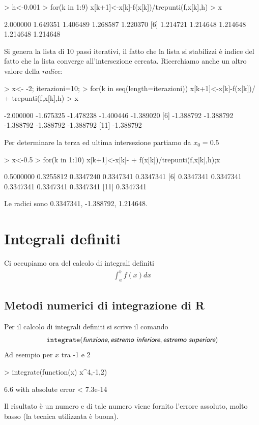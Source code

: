 \documentclass[onecolumn,11pt]{book}
\newcommand{\varia}[1]{\textsl{\textsf{#1}}}
\begin{document}
\begin{Schunk}
\begin{Sinput}
> h<-0.001
> for(k in 1:9) x[k+1]<-x[k]-f(x[k])/trepunti(f,x[k],h)
> x
\end{Sinput}
\begin{Soutput}
 [1] 2.000000 1.649351 1.406489 1.268587 1.220370
 [6] 1.214721 1.214648 1.214648 1.214648 1.214648
\end{Soutput}
\end{Schunk}
Si genera la lista di 10 passi iterativi, il fatto che la lista si stabilizzi \`e indice del fatto che la lista converge all'intersezione cercata.  Ricerchiamo anche un altro valore della {\it radice}:
\begin{Schunk}
\begin{Sinput}
> x<- -2; iterazioni=10;
> for(k in seq(length=iterazioni)) x[k+1]<-x[k]-f(x[k])/
+ trepunti(f,x[k],h)
> x
\end{Sinput}
\begin{Soutput}
 [1] -2.000000 -1.675325 -1.478238 -1.400446 -1.389020
 [6] -1.388792 -1.388792 -1.388792 -1.388792 -1.388792
[11] -1.388792
\end{Soutput}
\end{Schunk}
Per determinare la terza ed ultima intersezione partiamo da $x_0=0.5$
\begin{Schunk}
\begin{Sinput}
> x<-0.5
> for(k in 1:10) x[k+1]<-x[k]-
+ f(x[k])/trepunti(f,x[k],h);x
\end{Sinput}
\begin{Soutput}
 [1] 0.5000000 0.3255812 0.3347240 0.3347341 0.3347341
 [6] 0.3347341 0.3347341 0.3347341 0.3347341 0.3347341
[11] 0.3347341
\end{Soutput}
\end{Schunk}
Le radici sono 0.3347341, -1.388792, 1.214648.
\section{Integrali definiti}
Ci occupiamo ora del calcolo di integrali definiti
\begin{eqnarray*}
\int_a^b f(x)dx
\end{eqnarray*}

\subsection{Metodi numerici di integrazione di \textsf{R}}
Per il calcolo di integrali definiti si scrive il comando
\begin{eqnarray*}
\texttt{integrate}(\varia{funzione},
\varia{estremo inferiore}, \varia{estremo superiore})
\end{eqnarray*}
Ad esempio per $x$ tra -1 e 2
\begin{Schunk}
\begin{Sinput}
> integrate(function(x) x^4,-1,2) 
\end{Sinput}
\begin{Soutput}
6.6 with absolute error < 7.3e-14
\end{Soutput}
\end{Schunk}
Il risultato \`e un numero e di tale numero viene fornito l'errore assoluto, molto basso (la tecnica utilizzata \`e buona).
\end{document}
